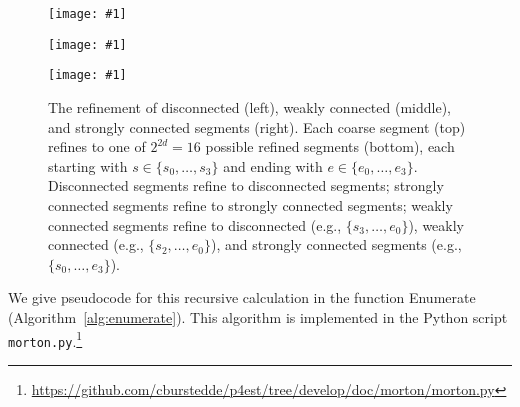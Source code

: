 \documentclass[a4paper,11pt]{article}
\newcommand{\inputtikz}[1]{\texttt{[image: \#1]}}
\newcommand{\figlab}[1]{\label{fig:#1}}
\newcommand{\algref}[1]{Algorithm~\ref{alg:#1}}
\begin{document}
\begin{figure}\centering
  \begin{minipage}{0.32\textwidth}\centering
    \inputtikz{segmentrecurse1}
  \end{minipage}
  \begin{minipage}{0.32\textwidth}\centering
    \inputtikz{segmentrecurse2}
  \end{minipage}
  \begin{minipage}{0.32\textwidth}\centering
    \inputtikz{segmentrecurse3}
  \end{minipage}
  \caption{The refinement of disconnected (left), weakly connected (middle), and
    strongly connected segments (right).  Each coarse segment (top) refines to
    one of $2^{2d}=16$ possible refined segments (bottom), each starting with
    $s\in \{s_0,\dots,s_3\}$ and ending with $e\in \{e_0,\dots,e_3\}$.
    Disconnected segments refine to disconnected segments; strongly connected
    segments refine to strongly connected segments; weakly connected segments
    refine to disconnected (e.g., $\{s_3,\dots,e_0\}$), weakly connected
    (e.g., $\{s_2,\dots,e_0\}$), and strongly connected segments (e.g.,
    $\{s_0,\dots,e_3\}$).}\figlab{segmentrecurse}
\end{figure}We give pseudocode for this recursive calculation in the function Enumerate
(\algref{enumerate}).  This algorithm is implemented in the Python script
\texttt{morton.py}.\footnote{\url{https://github.com/cburstedde/p4est/tree/develop/doc/morton/morton.py}}
\end{document}
